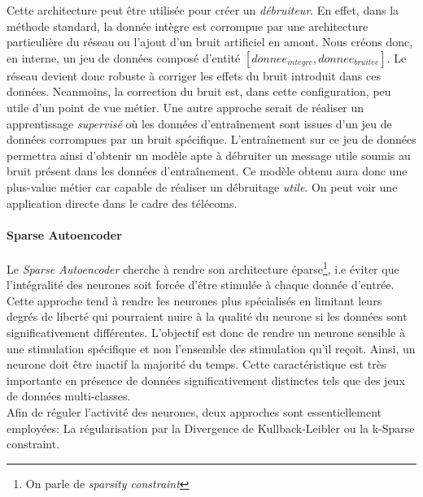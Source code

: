 \noindent Cette architecture peut être utilisée pour créer un \textit{débruiteur}. En effet, dans la méthode standard, la donnée intègre est corrompue par une architecture particulière du réseau ou l'ajout d'un bruit artificiel en amont. Nous créons donc, en interne, un jeu de données composé d'entité $[donnee_{integre}, donnee_{bruitee}]$. Le réseau devient donc robuste à corriger les effets du bruit introduit dans ces données. Neanmoins, la correction du bruit est, dans cette configuration, peu utile d'un point de vue métier. Une autre approche serait de réaliser un apprentissage \textit{supervisé} où les données d'entraînement sont issues d'un jeu de données corrompues par un bruit spécifique. L'entraînement sur ce jeu de données permettra ainsi d'obtenir un modèle apte à débruiter un message utile soumis au bruit présent dans les données d'entraînement. Ce modèle obtenu aura donc une plus-value métier car capable de réaliser un débruitage \textit{utile}. On peut voir une application directe dans le cadre des télécoms.

\paragraph{Sparse Autoencoder}
Le \textit{Sparse Autoencoder}\cite{sparseauto} cherche à rendre son architecture éparse\footnote{On parle de \textit{sparsity constraint}}, i.e éviter que l'intégralité des neurones soit forcée d'être stimulée à chaque donnée d'entrée. Cette approche tend à rendre les neurones plus spécialisés en limitant leurs degrés de liberté qui pourraient nuire à la qualité du neurone si les données sont significativement différentes. L'objectif est donc de rendre un neurone sensible à une stimulation spécifique et non l'ensemble des stimulation qu'il reçoit. Ainsi, un neurone doit être inactif la majorité du temps. Cette caractéristique est très importante en présence de données significativement distinctes tels que des jeux de données multi-classes.\\

\noindent Afin de réguler l'activité des neurones, deux approches sont essentiellement employées: La régularisation par la Divergence de Kullback-Leibler ou la k-Sparse constraint.\\


